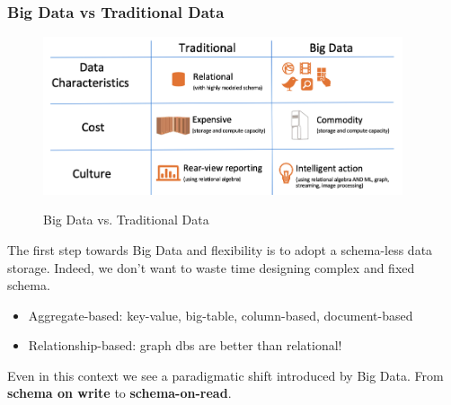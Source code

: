 \documentclass[10pt,a4paper]{article}
\begin{document}
\subsubsection{Big Data vs Traditional Data}
 \begin{figure}[h!]
 \hfill \includegraphics[width=300pt]{images/big-vs-traditional.png}\hspace*{\fill}
  \label{fig:big-vs-traditional}
  \caption{Big Data vs. Traditional Data}
\end{figure}
The first step towards Big Data and flexibility is to adopt a schema-less data storage. Indeed, we don't want to waste time designing complex and fixed schema.
\begin{itemize}
	\item Aggregate-based: key-value, big-table, column-based, document-based
	\item Relationship-based: graph dbs are better than relational!
\end{itemize}
Even in this context we see a paradigmatic shift introduced by Big Data. From \textbf{schema on write} to \textbf{schema-on-read}.
\end{document}
